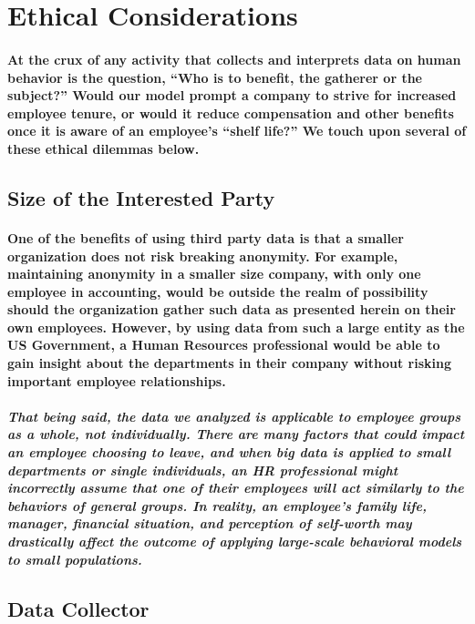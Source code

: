 \documentclass{article}
\begin{document}
\section{Ethical Considerations}

\paragraph{At the crux of any activity that collects and interprets data on human behavior is the question, “Who is to benefit, the gatherer or the subject?” Would our model prompt a company to strive for increased employee tenure, or would it reduce compensation and other benefits once it is aware of an employee’s “shelf life?” We touch upon several of these ethical dilemmas below.}
 
\subsection{Size of the Interested Party}

\paragraph{One of the benefits of using third party data is that a smaller organization does not risk breaking anonymity. For example, maintaining anonymity in a smaller size company, with only one employee in accounting, would be outside the realm of possibility should the organization gather such data as presented herein on their own employees. However, by using data from such a large entity as the US Government, a Human Resources professional would be able to gain insight about the departments in their company without risking important employee relationships.}
 
\subparagraph{That being said, the data we analyzed is applicable to employee groups as a whole, not individually. There are many factors that could impact an employee choosing to leave, and when big data is applied to small departments or single individuals, an HR professional might incorrectly assume that one of their employees will act similarly to the behaviors of general groups. In reality, an employee’s family life, manager, financial situation, and perception of self-worth may drastically affect the outcome of applying large-scale behavioral models to small populations.}
 
\subsection{Data Collector}
\end{document}
